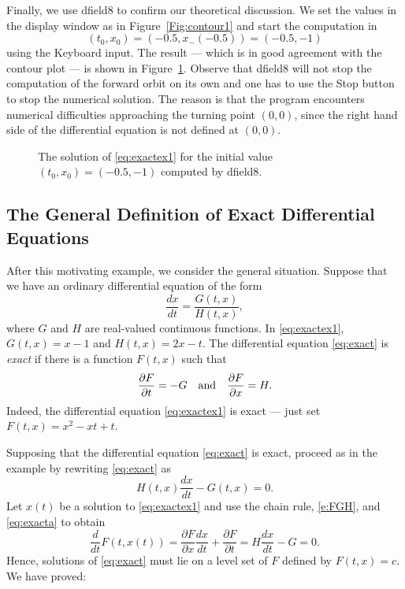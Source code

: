 \documentclass{ximera}
\begin{document}
Finally, we use {\sf dfield8} to confirm our 
theoretical discussion.  We set the values in {\sf the display window}
as in Figure~\ref{Fig:contour1} and start the computation in 
\[
(t_0,x_0)=(-0.5,x_-(-0.5))=(-0.5,-1)
\]
using the {\sf Keyboard input}.  The result --- which is in good
agreement with the contour plot --- is shown in
Figure~\ref{Fig:contour2}.  Observe that {\sf dfield8} will not 
stop the computation of the forward orbit on its own and one has to
use the {\sf Stop} button to stop the numerical solution.  The reason is
that the program encounters numerical difficulties approaching the turning
point $(0,0)$, since the right hand side of the differential equation is
not defined at $(0,0)$.

\begin{figure}[htb]
  \centerline{%
  }
  \caption{The solution of \protect\eqref{eq:exactex1} for the
  initial value $(t_0,x_0)=(-0.5,-1)$ computed by {\sf dfield8}.}
  \label{Fig:contour2}
\end{figure}

\subsection*{The General Definition of Exact Differential Equations}

After this motivating example, we consider the general
situation.  Suppose that we have an ordinary differential
equation of the form
\begin{equation} \label{eq:exact}
\frac{dx}{dt} = \frac{G(t,x)}{H(t,x)},
\end{equation}
where $G$ and $H$ are real-valued continuous functions.  In 
\eqref{eq:exactex1}, $G(t,x)=x-1$ and $H(t,x) = 2x-t$.
The differential equation \eqref{eq:exact} is {\em exact\/} 
 if
there is a function $F(t,x)$ such that
\begin{equation}  \label{e:FGH}
\frac{\partial F}{\partial t} = -G \quad\mbox{and}\quad
\frac{\partial F}{\partial x} =  H.
\end{equation}
Indeed, the differential equation \eqref{eq:exactex1} is exact --- just set 
$F(t,x) = x^2 - xt + t$.

Supposing that the differential equation \eqref{eq:exact} is exact, proceed as 
in the example by rewriting \eqref{eq:exact} as 
\begin{equation} \label{eq:exacta}
H(t,x)\frac{dx}{dt} - G(t,x) = 0.
\end{equation}
Let $x(t)$ be a solution to \eqref{eq:exactex1} and use the chain rule, 
\eqref{e:FGH}, and \eqref{eq:exacta} to obtain
\[
\frac{d}{dt} F(t,x(t)) = \frac{\partial F}{\partial x}\frac{dx}{dt} + 
\frac{\partial F}{\partial t} = H\frac{dx}{dt}-G = 0.
\]
Hence, solutions of \eqref{eq:exact} must lie on a level set of $F$ defined 
by $F(t,x) = c$. We have proved:
\end{document}
